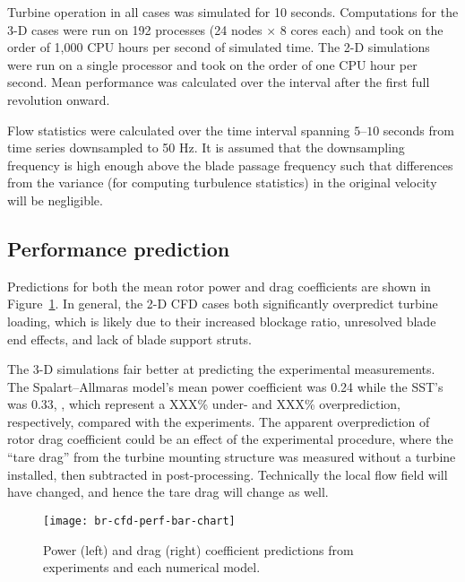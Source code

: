Turbine operation in all cases was simulated for 10 seconds. Computations for
the 3-D cases were run on 192 processes (24 nodes $\times$ 8 cores each) and
took on the order of 1,000 CPU hours per second of simulated time. The 2-D
simulations were run on a single processor and took on the order of one CPU hour
per second. Mean performance was calculated over the interval after the first
full revolution onward.

Flow statistics were calculated over the time interval spanning $5$--$10$
seconds from time series downsampled to 50 Hz. It is assumed that the
downsampling frequency is high enough above the blade passage frequency such
that differences from the variance (for computing turbulence statistics) in the
original velocity will be negligible.


\subsection{Performance prediction}

Predictions for both the mean rotor power and drag coefficients are shown in
Figure~\ref{fig:br-cfd-perf-bar-chart}. In general, the 2-D CFD cases both
significantly overpredict turbine loading, which is likely due to their
increased blockage ratio, unresolved blade end effects, and lack of blade
support struts.

The 3-D simulations fair better at predicting the experimental measurements. The
Spalart--Allmaras model's mean power coefficient was 0.24 while the SST's was
0.33, , which represent
a XXX\% under- and XXX\% overprediction, respectively, compared with the
experiments. The apparent overprediction of rotor drag coefficient could be an
effect of the experimental procedure, where the ``tare drag'' from the turbine
mounting structure was measured without a turbine installed, then subtracted in
post-processing. Technically the local flow field will have changed, and hence
the tare drag will change as well.

\begin{figure}
    \centering

    \texttt{[image: br-cfd-perf-bar-chart]}

    \caption{Power (left) and drag (right) coefficient predictions from
        experiments and each numerical model.}

    \label{fig:br-cfd-perf-bar-chart}
\end{figure}



